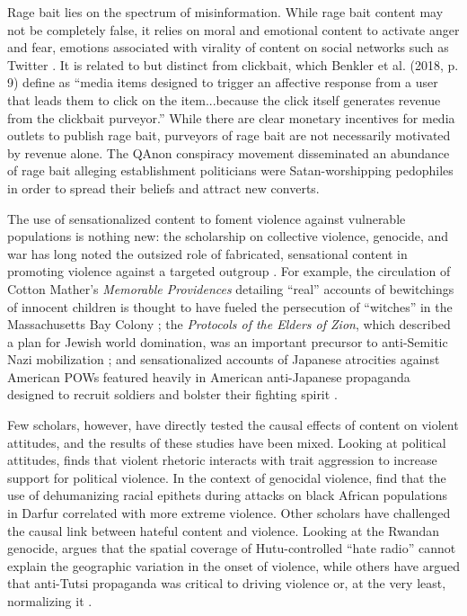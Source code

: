 Rage bait lies on the spectrum of misinformation. While rage bait content may not be completely false, it relies on moral and emotional content to activate anger and fear, emotions associated with virality of content on social networks such as Twitter \citep{brady2017emotion}. It is related to but distinct from clickbait, which Benkler et al. (2018, p. 9) define as ``media items designed to trigger an affective response from a user that leads them to click on the item...because the click itself generates revenue from the clickbait purveyor.'' While there are clear monetary incentives for media outlets to publish rage bait, purveyors of rage bait are not necessarily motivated by revenue alone. The QAnon conspiracy movement disseminated an abundance of rage bait alleging establishment politicians were Satan-worshipping pedophiles in order to spread their beliefs and attract new converts. 

The use of sensationalized content to foment violence against vulnerable populations is nothing new: the scholarship on collective violence, genocide, and war has long noted the outsized role of fabricated, sensational content in promoting violence against a targeted outgroup \citep{charny2019can, cohn1967warrant, dower1986war, fein1979accounting, herf2006jewish, hill1995delusion, goldhagen1997hitler, goldhagen2009worse, tsesis2002destructive}. For example, the circulation of Cotton Mather's \textit{Memorable Providences} detailing ``real'' accounts of bewitchings of innocent children is thought to have fueled the persecution of ``witches'' in the Massachusetts Bay Colony \citep{hill1995delusion}; the \textit{Protocols of the Elders of Zion}, which described a plan for Jewish world domination, was an important precursor to anti-Semitic Nazi mobilization \citep{cohn1967warrant,herf2006jewish}; and sensationalized accounts of Japanese atrocities against American POWs featured heavily in American anti-Japanese propaganda designed to recruit soldiers and bolster their fighting spirit \citep{dower1986war}. 

Few scholars, however, have directly tested the causal effects of content on violent attitudes, and the results of these studies have been mixed. Looking at political attitudes, \cite{kalmoe2014fueling} finds that violent rhetoric interacts with trait aggression to increase support for political violence. In the context of genocidal violence, \cite{hagan2008darfur} find that the use of dehumanizing racial epithets during attacks on black African populations in Darfur correlated with more extreme violence. Other scholars have challenged the causal link between hateful content and violence. Looking at the Rwandan genocide, \cite{straus2007relationship} argues that the spatial coverage of Hutu-controlled ``hate radio'' cannot explain the geographic variation in the onset of violence, while others have argued that anti-Tutsi propaganda was critical to driving violence or, at the very least, normalizing it \citep{fujii2004transforming, yanagizawa2014propaganda}.

